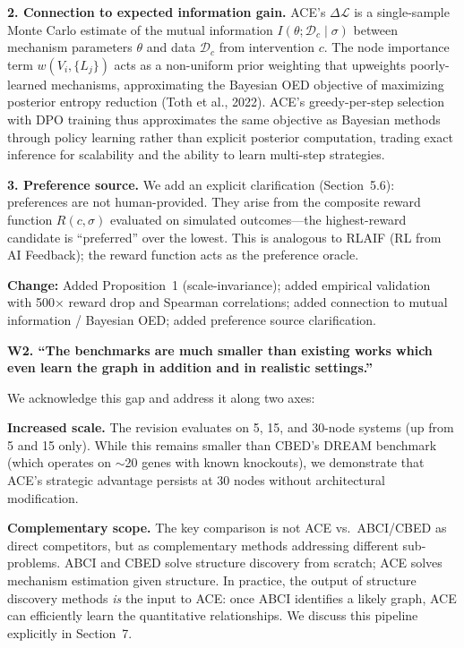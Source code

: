 \documentclass[11pt]{article}
\newcommand{\reviewer}[1]{\vspace{0.8em}\noindent\textbf{\textcolor{reviewercolor}{#1}}}
\newcommand{\response}{\vspace{0.3em}\noindent\textcolor{responsecolor}}
\newcommand{\change}[1]{\textcolor{changecolor}{\textbf{Change:} #1}}
\begin{document}
\textbf{2. Connection to expected information gain.} ACE's $\Delta\mathcal{L}$ is a single-sample Monte Carlo estimate of the mutual information $I(\theta; \mathcal{D}_c \mid \sigma)$ between mechanism parameters $\theta$ and data $\mathcal{D}_c$ from intervention $c$. The node importance term $w(V_i, \{L_j\})$ acts as a non-uniform prior weighting that upweights poorly-learned mechanisms, approximating the Bayesian OED objective of maximizing posterior entropy reduction (Toth et al., 2022). ACE's greedy-per-step selection with DPO training thus approximates the same objective as Bayesian methods through policy learning rather than explicit posterior computation, trading exact inference for scalability and the ability to learn multi-step strategies.

\textbf{3. Preference source.} We add an explicit clarification (Section~5.6): preferences are not human-provided. They arise from the composite reward function $R(c, \sigma)$ evaluated on simulated outcomes---the highest-reward candidate is ``preferred'' over the lowest. This is analogous to RLAIF (RL from AI Feedback); the reward function acts as the preference oracle.

\change{Added Proposition~1 (scale-invariance); added empirical validation with 500$\times$ reward drop and Spearman correlations; added connection to mutual information / Bayesian OED; added preference source clarification.}

\reviewer{W2. ``The benchmarks are much smaller than existing works which even learn the graph in addition and in realistic settings.''}

\response We acknowledge this gap and address it along two axes:

\textbf{Increased scale.} The revision evaluates on 5, 15, and 30-node systems (up from 5 and 15 only). While this remains smaller than CBED's DREAM benchmark (which operates on $\sim$20 genes with known knockouts), we demonstrate that ACE's strategic advantage persists at 30 nodes without architectural modification.

\textbf{Complementary scope.} The key comparison is not ACE vs.\ ABCI/CBED as direct competitors, but as complementary methods addressing different sub-problems. ABCI and CBED solve structure discovery from scratch; ACE solves mechanism estimation given structure. In practice, the output of structure discovery methods \emph{is} the input to ACE: once ABCI identifies a likely graph, ACE can efficiently learn the quantitative relationships. We discuss this pipeline explicitly in Section~7.
\end{document}
